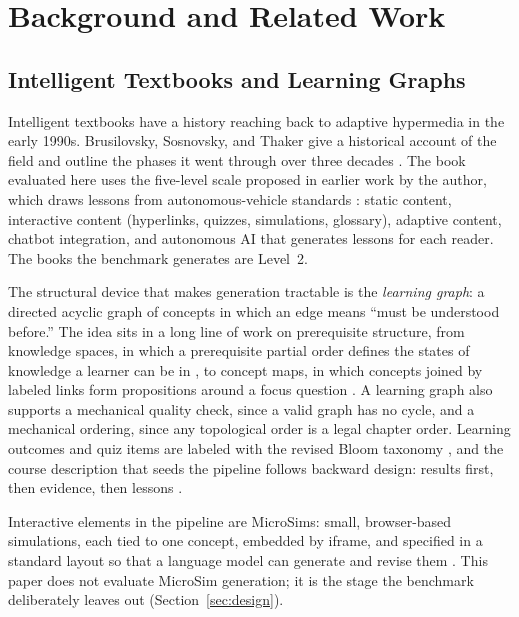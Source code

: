 \section{Background and Related Work}
\label{sec:related}

\subsection{Intelligent Textbooks and Learning Graphs}

Intelligent textbooks have a history reaching back to adaptive hypermedia in the early 1990s. Brusilovsky, Sosnovsky, and Thaker give a historical account of the field and outline the phases it went through over three decades \cite{brusilovsky2022return}. The book evaluated here uses the five-level scale proposed in earlier work by the author, which draws lessons from autonomous-vehicle standards \cite{mccreary2025fivelevels}: static content, interactive content (hyperlinks, quizzes, simulations, glossary), adaptive content, chatbot integration, and autonomous AI that generates lessons for each reader. The books the benchmark generates are Level~2.

The structural device that makes generation tractable is the \textit{learning graph}: a directed acyclic graph of concepts in which an edge means ``must be understood before.'' The idea sits in a long line of work on prerequisite structure, from knowledge spaces, in which a prerequisite partial order defines the states of knowledge a learner can be in \cite{doignon1999knowledge}, to concept maps, in which concepts joined by labeled links form propositions around a focus question \cite{novak2008concept}. A learning graph also supports a mechanical quality check, since a valid graph has no cycle, and a mechanical ordering, since any topological order is a legal chapter order. Learning outcomes and quiz items are labeled with the revised Bloom taxonomy \cite{anderson2001taxonomy}, and the course description that seeds the pipeline follows backward design: results first, then evidence, then lessons \cite{wiggins2005ubd}.

Interactive elements in the pipeline are MicroSims: small, browser-based simulations, each tied to one concept, embedded by iframe, and specified in a standard layout so that a language model can generate and revise them \cite{mccreary2025microsims}. This paper does not evaluate MicroSim generation; it is the stage the benchmark deliberately leaves out (Section~\ref{sec:design}).

